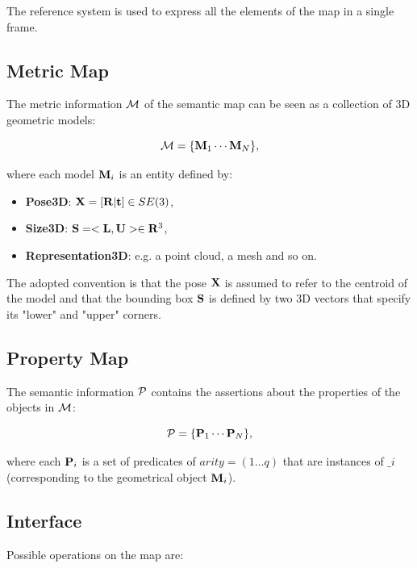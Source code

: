 \documentclass{article}
\begin{document}
	The reference system is used to express all the elements of the map in a single frame.
	
	\subsection{Metric Map}	
		
	The metric information $\mathcal{M}$ of the semantic map can be seen as a collection of 3D geometric models:
	
	\begin{equation}
		\mathcal{M} = \{\mathbf{M}_1 \cdots \mathbf{M}_N\},
	\end{equation}
	
	\noindent	
	where each model $\mathbf{M}_i$ is an entity defined by:
	
	\begin{itemize}
		\item {\bf Pose3D}: $\mathbf{X} = [ \mathbf{R} | \mathbf{t}] \in SE(3)$,
		\item {\bf Size3D}: $\mathbf{S} = <\mathbf{L} ,\mathbf{U}> \in \mathbf{R}^3 $,
		\item {\bf Representation3D}: e.g. a point cloud, a mesh and so on.
	\end{itemize}
	
	The adopted convention is that the pose $\mathbf{X}$ is assumed to refer to the centroid of the model and that the bounding box $\mathbf{S}$ is defined by two 3D vectors that specify its "lower" and "upper" corners.
	
	\subsection{Property Map}	
		
	The semantic information $\mathcal{P}$ contains the assertions about the properties of the objects in $\mathcal{M}$:
	
	\begin{equation}
	\mathcal{P} = \{\mathbf{P}_1 \cdots \mathbf{P}_N\},
	\end{equation}
	
	\noindent
	where each $\mathbf{P}_i$ is a set of predicates of $arity = (1 \dots q)$ that are instances of $\bm_i$ (corresponding to the geometrical object $\mathbf{M}_i$).
	
	\subsection{Interface}
	
	Possible operations on the map are:
	
\end{document}
